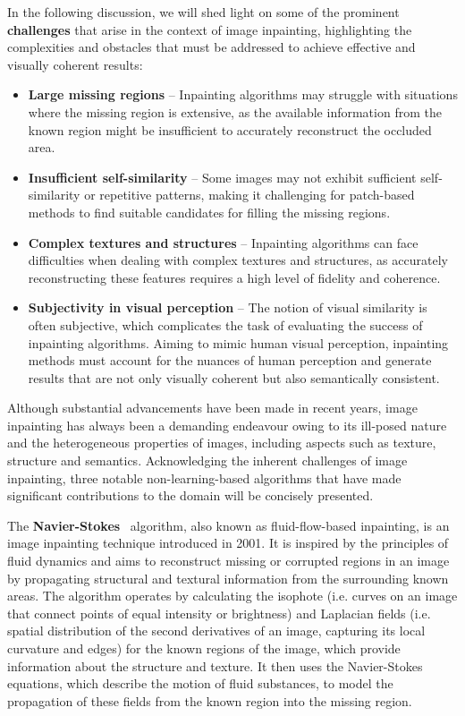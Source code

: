 In the following discussion, we will shed light on some of the prominent \textbf{challenges} that arise in the context of image inpainting, highlighting the complexities and obstacles that must be addressed to achieve effective and visually coherent results:
\begin{itemize}[leftmargin=1.5em]
    \setlength\itemsep{0.2cm}

    \item \textbf{Large missing regions} --  Inpainting algorithms may struggle with situations where the missing region is extensive, as the available information from the known region might be insufficient to accurately reconstruct the occluded area.

    \item \textbf{Insufficient self-similarity} -- Some images may not exhibit sufficient self-similarity or repetitive patterns, making it challenging for patch-based methods to find suitable candidates for filling the missing regions.

    \item \textbf{Complex textures and structures} -- Inpainting algorithms can face difficulties when dealing with complex textures and structures, as accurately reconstructing these features requires a high level of fidelity and coherence.

    \item \textbf{Subjectivity in visual perception} -- The notion of visual similarity is often subjective, which complicates the task of evaluating the success of inpainting algorithms. Aiming to mimic human visual perception, inpainting methods must account for the nuances of human perception and generate results that are not only visually coherent but also semantically consistent.
\end{itemize}

Although substantial advancements have been made in recent years, image inpainting has always been a demanding endeavour owing to its ill-posed nature and the heterogeneous properties of images, including aspects such as texture, structure and semantics. Acknowledging the inherent challenges of image inpainting, three notable non-learning-based algorithms that have made significant contributions to the domain will be concisely presented.


The \textbf{Navier-Stokes}~\supercite{navier-stokes} algorithm, also known as fluid-flow-based inpainting, is an image inpainting technique introduced in 2001. It is inspired by the principles of fluid dynamics and aims to reconstruct missing or corrupted regions in an image by propagating structural and textural information from the surrounding known areas. The algorithm operates by calculating the isophote (i.e. curves on an image that connect points of equal intensity or brightness) and Laplacian fields (i.e. spatial distribution of the second derivatives of an image, capturing its local curvature and edges) for the known regions of the image, which provide information about the structure and texture. It then uses the Navier-Stokes equations, which describe the motion of fluid substances, to model the propagation of these fields from the known region into the missing region.


